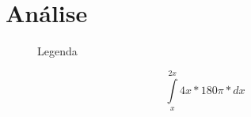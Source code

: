 \section{Análise}
\lipsum[1]
\begin{center}
	\begin{figure}[h]
		\caption{Legenda}
		\label{fig:placeholder.jpg}
	\end{figure}
	\begin{equation}
	\int\limits_{x}^{2x} 4x*180\pi*dx
	\end{equation}
\end{center}